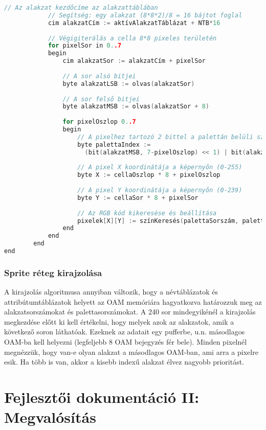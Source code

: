 \begin{lstlisting}[backgroundcolor = \color{white}, language=c, basicstyle=\scriptsize]
			// Az alakzat kezdőcíme az alakzattáblában
			// Segítség: egy alakzat (8*8*2)/8 = 16 bájtot foglal
			cim alakzatCím := aktívAlakzatTáblázat + NTB*16
				
			// Végigiterálás a cella 8*8 pixeles területén
			for pixelSor in 0..7
			begin
				cim alakzatSor := alakzatCím + pixelSor
				
				// A sor alsó bitjei
				byte alakzatLSB := olvas(alakzatSor)
				
				// A sor felső bitjei		
				byte alakzatMSB := olvas(alakzatSor + 8)
				
				for pixelOszlop 0..7
				begin
					// A pixelhez tartozó 2 bittel a palettán belüli szín meghatározása
					byte palettaIndex := 
					  (bit(alakzatMSB, 7-pixelOszlop) << 1) | bit(alakzatLSB, 7-pixelOszlop)
					
					// A pixel X koordinátája a képernyőn (0-255)
					byte X := cellaOszlop * 8 + pixelOszlop
					
					// A pixel Y koordinátája a képernyőn (0-239)
					byte Y := cellaSor * 8 + pixelSor
				
					// Az RGB kód kikeresése és beállítása
					pixelek[X][Y] := színKeresés(palettaSorszám, palettaIndex)
				end
			end
		end
end


\end{lstlisting}

\subsection{Sprite réteg kirajzolása}

A kirajzolás algoritmusa annyiban változik, hogy a névtáblázatok és attribútumtáblázatok helyett az OAM memóriára hagyatkozva határozzuk meg az alakzatsorszámokat és palettasorszámokat.
A 240 sor mindegyikénél a kirajzolás megkezdése előtt ki kell értékelni, hogy melyek azok az alakzatok, amik a következő soron láthatóak. Ezeknek az adatait egy pufferbe, u.n. másodlagos OAM-ba kell helyezni (legfeljebb 8 OAM bejegyzés fér bele). Minden pixelnél megnézzük, hogy van-e olyan alakzat a másodlagos OAM-ban, ami arra a pixelre esik. Ha több is van, akkor a kisebb indexű alakzat élvez nagyobb prioritást. 

\clearpage

\chapter{Fejlesztői dokumentáció II: Megvalósítás} %

